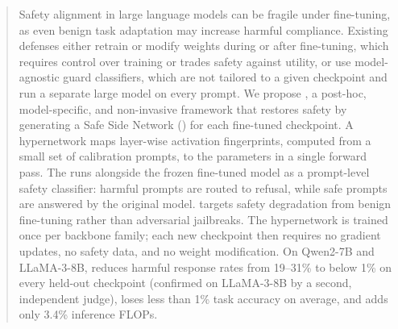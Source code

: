 \begin{abstract}
Safety alignment in large language models can be fragile under fine-tuning, as even benign task adaptation may increase harmful compliance. Existing defenses either retrain or modify weights during or after fine-tuning, which requires control over training or trades safety against utility, or use model-agnostic guard classifiers, which are not tailored to a given checkpoint and run a separate large model on every prompt. We propose \method{}, a post-hoc, model-specific, and non-invasive framework that restores safety by generating a Safe Side Network (\ssn{}) for each fine-tuned checkpoint. A hypernetwork maps layer-wise activation fingerprints, computed from a small set of calibration prompts, to the \ssn{} parameters in a single forward pass. The \ssn{} runs alongside the frozen fine-tuned model as a prompt-level safety classifier: harmful prompts are routed to refusal, while safe prompts are answered by the original model. \method{} targets safety degradation from benign fine-tuning rather than adversarial jailbreaks. The hypernetwork is trained once per backbone family; each new checkpoint then requires no gradient updates, no safety data, and no weight modification. On Qwen2-7B and LLaMA-3-8B, \method{} reduces harmful response rates from 19--31\% to below 1\% on every held-out checkpoint (confirmed on LLaMA-3-8B by a second, independent judge), loses less than 1\% task accuracy on average, and adds only 3.4\% inference FLOPs.
\end{abstract}
